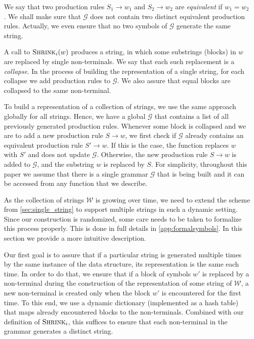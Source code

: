 \documentclass[a4paper]{article}
\newenvironment{shortv}{}{}
\theoremstyle{remark}
\newcommand{\shrink}[1]{\ensuremath{\textsc{Shrink}_{#1}}}
\newcommand{\str}{w}
\newcommand{\grammar}{\mathcal{G}}
\newcommand{\coll}{\mathcal{W}}
\begin{document}
\begin{shortv}
We say that two production rules $S_1 \rightarrow \str_1$ and $S_2 \rightarrow \str_2$ are \emph{equivalent} if $\str_1 = \str_2$.
We shall make sure that $\grammar$ does not contain two distinct equivalent production rules.
Actually, we even ensure that no two symbols of $\grammar$ generate the same string.

A call to $\shrink{i}(\str)$ produces a string, in which some substrings (blocks) in $\str$ are replaced by single non-terminals.
We say that each such replacement is a \emph{collapse}.
In the process of building the representation of a single string, for each collapse we add production rules to $\grammar$.
We also assure that equal blocks are collapsed to the same non-terminal.

To build a representation of a collection of strings, we use the same approach globally for all strings.
Hence, we have a global $\grammar$ that contains a list of all previously generated production rules.
Whenever some block is collapsed and we are to add a new production rule $S \rightarrow \str$, we first check if $\grammar$ already contains an equivalent production rule $S' \rightarrow \str$.
If this is the case, the function replaces $w$ with $S'$ and does not update $\grammar$.
Otherwise, the new production rule $S \rightarrow \str$ is added to $\grammar$, and the substring $\str$ is replaced by $S$.
For simplicity, throughout this paper we assume that there is a single grammar $\grammar$ that is being built and it can be accessed from any function that we describe.
\end{shortv}

As the collection of strings $\coll$ is growing over time, we need to extend the scheme from \cref{sec:single_string} to support multiple strings in such a dynamic setting.
Since our construction is randomized, some care needs to be taken to formalize this process properly.
This is done in full details in \cref{app:formalsymbols}.
In this section we provide a more intuitive description.

Our first goal is to assure that if a particular string is generated multiple times by the same instance of the data structure,
its representation is the same each time.
In order to do that, 
we ensure that if a block of symbols $w'$ is replaced by a non-terminal during the construction of the representation of some string of $\coll$, 
a new non-terminal is created only when the block $w'$ is encountered for the first time.
To this end, we use a dynamic dictionary (implemented as a hash table) that maps already encountered blocks to the non-terminals.
Combined with our definition of $\shrink{i}$, this suffices to ensure that each non-terminal in the grammar generates a distinct string.
\end{document}
